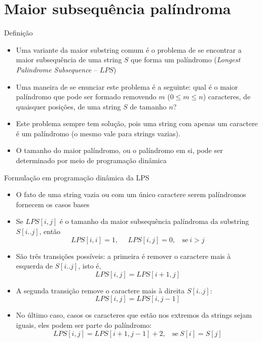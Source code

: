 \section{Maior subsequência palíndroma}

\begin{frame}[fragile]{Definição}

    \begin{itemize}
        \item Uma variante da maior substring comum é o problema de se encontrar a maior 
            subsequência de uma string $S$ que forma um palíndromo (\textit{Longest Palindrome 
            Subsequence} -- $LPS$)

        \item Uma maneira de se enunciar este problema é a seguinte: qual é o maior palíndromo que 
            pode ser formado removendo $m$ ($0 \leq m \leq n$) caracteres, de quaisquer posições, 
            de uma string $S$ de tamanho $n$?

        \item Este problema sempre tem solução, pois uma string com apenas um caractere é um 
            palíndromo (o mesmo vale para strings vazias).

        \item O tamanho do maior palíndromo, ou o palíndromo em si, pode ser determinado por
            meio de programação dinâmica
    \end{itemize}
\end{frame}

\begin{frame}[fragile]{Formulação em programação dinâmica da LPS}

    \begin{itemize}
        \item O fato de uma string vazia ou com um único caractere serem palíndromos fornecem os
            casos bases

        \item Se $LPS[i,j]$ é o tamanho da maior subsequência palíndroma da substring 
            $S[i..j]$, então
            \[
                LPS[i,i] = 1, \ \ \ \ \ \ LPS[i,j] = 0, \ \ \ \ \mbox{se}\ i > j
            \]

        \item São três transições possíveis:
        a primeira é remover o caractere mais à esquerda de $S[i..j]$, isto é,
        \[
             LPS[i,j] = LPS[i+1,j]
        \]

        \item A segunda transição remove o caractere mais à direita $S[i..j]$:
        \[
            LPS[i, j] = LPS[i, j - 1]
        \] 

        \item No último caso, casos os caracteres que estão nos extremos da strings sejam iguais, 
            eles podem ser parte do palíndromo: 
        \[
            LPS[i,j] = LPS[i+1,j-1] + 2,\ \ \ \ \mbox{se}\ S[i] = S[j]
        \]

    \end{itemize}

\end{frame}

